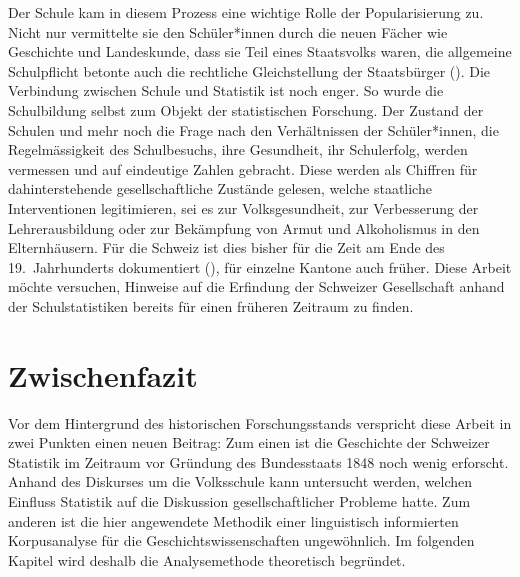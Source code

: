 Der Schule kam in diesem Prozess eine wichtige Rolle der Popularisierung zu. Nicht nur vermittelte sie den Schüler*innen durch die neuen Fächer wie Geschichte und Landeskunde, dass sie Teil eines Staatsvolks waren, die allgemeine Schulpflicht betonte auch die rechtliche Gleichstellung der Staatsbürger (\cite{criblez_erziehung_1998, dahn_learning_2015}). Die Verbindung zwischen Schule und Statistik ist noch enger. So wurde die Schulbildung selbst zum Objekt der statistischen Forschung. Der Zustand der Schulen und mehr noch die Frage nach den Verhältnissen der Schüler*innen, die Regelmässigkeit des Schulbesuchs, ihre Gesundheit, ihr Schulerfolg, werden vermessen und auf eindeutige Zahlen gebracht. Diese werden als Chiffren für dahinterstehende gesellschaftliche Zustände gelesen, welche staatliche Interventionen legitimieren, sei es zur Volksgesundheit, zur Verbesserung der Lehrerausbildung oder zur Bekämpfung von Armut und Alkoholismus in den Elternhäusern. Für die Schweiz ist dies bisher für die Zeit am Ende des 19.~Jahrhunderts dokumentiert (\cite{ruoss_zahlen_2018}), für einzelne Kantone auch früher. Diese Arbeit möchte versuchen, Hinweise auf die Erfindung der Schweizer Gesellschaft anhand der Schulstatistiken bereits für einen früheren Zeitraum zu finden.

\section{Zwischenfazit}

Vor dem Hintergrund des historischen Forschungsstands verspricht diese Arbeit in zwei Punkten einen neuen Beitrag: Zum einen ist die Geschichte der Schweizer Statistik im Zeitraum vor Gründung des Bundesstaats 1848 noch wenig erforscht. Anhand des Diskurses um die Volksschule kann untersucht werden, welchen Einfluss Statistik auf die Diskussion gesellschaftlicher Probleme hatte. Zum anderen ist die hier angewendete Methodik einer linguistisch informierten Korpusanalyse für die Geschichtswissenschaften ungewöhnlich. Im folgenden Kapitel wird deshalb die Analysemethode theoretisch begründet. 